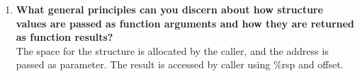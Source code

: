 \documentclass{article}
\begin{document}
\begin{enumerate}[label=\textbf{\Alph*.}]
\begin{figure}[h]
		\caption{Stack after call process}
		\label{fig:stack2}
	\end{figure}
	See figure \ref{fig:stack2}. The function eval access the elements of structure r
	by \%rsp and offset.
	\item \textbf{What general principles can you discern about how structure values
	are passed as function arguments and how they are returned as function results?} \\
	The space for the structure is allocated by the caller, and the address is passed
	as parameter. The result is accessed by caller using \%rsp and offset.
\end{enumerate}
\end{document}
